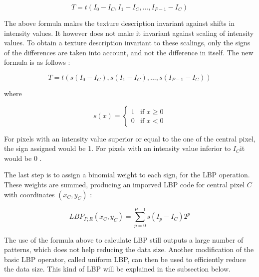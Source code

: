 \begin{equation}
   T = t(I_0 - I_C, I_1 - I_C, ..., I_{P-1} - I_C)
\end{equation}

\vspace{\baselineskip}
\noindent The above formula makes the texture description invariant against shifts in intensity values. It however does not make it invariant against scaling of intensity values. To obtain a texture description invariant to these scalings, only the signs of the differences are taken into account, and not the difference in itself. The new formula is as follows \cite{GAN08}:
\newline

\begin{equation}
   T = t(s(I_0 - I_C), s(I_1 - I_C), ..., s(I_{P-1} - I_C))
\end{equation}

\noindent where
\newline

\begin{equation}
s(x) = \left\{
    \begin{array}{ll}
        1 & \mbox{if } x\geq0 \\
        0 & \mbox{if } x < 0
    \end{array}
\right.
\end{equation}

\vspace{\baselineskip}
\noindent For pixels with an intensity value superior or equal to the one of the central pixel, the sign assigned would be 1. For pixels with an intensity value inferior to $I_C$it  would be 0 \cite{GAN08}.
\newline

\noindent The last step is to assign a binomial weight to each sign, for the LBP operation. These weights are summed, producing an imporved LBP code for central pixel $ C $ with coordinates $ (x_C,y_C) $ \cite{GAN08}:
\newline

\begin{equation}
   LBP_{P,R}(x_C,y_C) = \sum_{p = 0}^{P-1} s(I_p - I_C)2^p
   \label{texture_equation}
\end{equation}

\vspace{\baselineskip}
\noindent The use of the formula above to calculate LBP still outputs a large number of patterns, which does not help reducing the data size. Another modification of the basic LBP operator, called uniform LBP, can then be used to efficiently reduce the data size. This kind of LBP will be explained in the subsection below.
\newline

